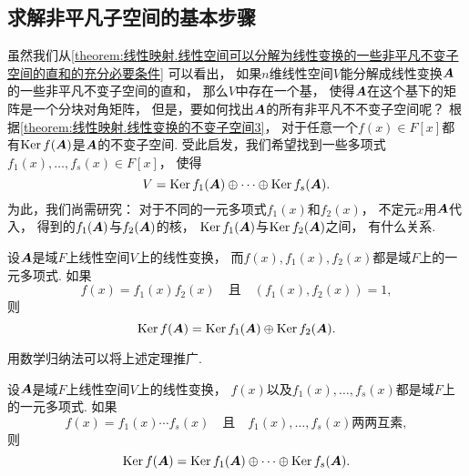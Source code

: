 \subsection{求解非平凡子空间的基本步骤}
虽然我们从\cref{theorem:线性映射.线性空间可以分解为线性变换的一些非平凡不变子空间的直和的充分必要条件} 可以看出，
如果\(n\)维线性空间\(V\)能分解成线性变换\(\boldsymbol{A}\)的一些非平凡不变子空间的直和，
那么\(V\)中存在一个基，
使得\(\boldsymbol{A}\)在这个基下的矩阵是一个分块对角矩阵，
但是，要如何找出\(\boldsymbol{A}\)的所有非平凡不不变子空间呢？
根据\cref{theorem:线性映射.线性变换的不变子空间3}，
对于任意一个\(f(x) \in F[x]\)都有\(\operatorname{Ker} f(\boldsymbol{A})\)是\(\boldsymbol{A}\)的不变子空间.
受此启发，我们希望找到一些多项式\(f_1(x),\dotsc,f_s(x) \in F[x]\)，
使得\begin{equation*}
	V = \operatorname{Ker} f_1(\boldsymbol{A}) \oplus \dotsb \oplus \operatorname{Ker} f_s(\boldsymbol{A}).
\end{equation*}
为此，我们尚需研究：
对于不同的一元多项式\(f_1(x)\)和\(f_2(x)\)，
不定元\(x\)用\(\boldsymbol{A}\)代入，
得到的\(f_1(\boldsymbol{A})\)与\(f_2(\boldsymbol{A})\)的核，
\(\operatorname{Ker} f_1(\boldsymbol{A})\)与\(\operatorname{Ker} f_2(\boldsymbol{A})\)之间，
有什么关系.
\begin{theorem}%
设\(\boldsymbol{A}\)是域\(F\)上线性空间\(V\)上的线性变换，
而\(f(x),f_1(x),f_2(x)\)都是域\(F\)上的一元多项式.
如果\begin{equation*}
	f(x) = f_1(x) f_2(x)
	\quad\text{且}\quad
	(f_1(x),f_2(x)) = 1,
\end{equation*}
则\begin{equation*}
	\operatorname{Ker} f(\boldsymbol{A})
	= \operatorname{Ker} f_1(\boldsymbol{A})
	\oplus \operatorname{Ker} f_2(\boldsymbol{A}).
\end{equation*}
\end{theorem}

用数学归纳法可以将上述定理推广.
\begin{corollary}\label{theorem:线性映射.线性映射多项式的核空间的直和分解式2}
设\(\boldsymbol{A}\)是域\(F\)上线性空间\(V\)上的线性变换，
\(f(x)\)以及\(f_1(x),\dotsc,f_s(x)\)都是域\(F\)上的一元多项式.
如果\begin{equation*}
	f(x) = f_1(x) \dotsm f_s(x)
	\quad\text{且}\quad
	\text{$f_1(x),\dotsc,f_s(x)$两两互素},
\end{equation*}
则\begin{equation*}
	\operatorname{Ker} f(\boldsymbol{A})
	= \operatorname{Ker} f_1(\boldsymbol{A})
	\oplus
	\dotsb
	\oplus \operatorname{Ker} f_s(\boldsymbol{A}).
\end{equation*}
\end{corollary}

